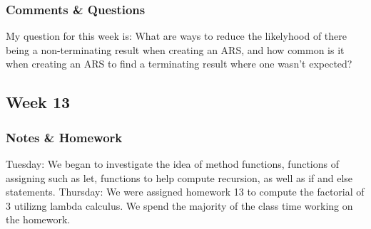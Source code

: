 \documentclass{article}
\theoremstyle{theorem}
\theoremstyle{definition}
\theoremstyle{remark}
\begin{document}
\subsubsection{Comments \& Questions}
My question for this week is: What are ways to reduce the likelyhood of there being a non-terminating result when creating an ARS, and how common is it when creating an ARS to find a terminating result where one wasn't expected? 

\subsection{Week 13}
\subsubsection{Notes \& Homework}

Tuesday: We began to investigate the idea of method functions, functions of assigning such as let, functions to help compute recursion, as well as if and else statements.
\newline
Thursday: We were assigned homework 13 to compute the factorial of 3 utilizng lambda calculus. We spend the majority of the class time working on the homework.
\end{document}
